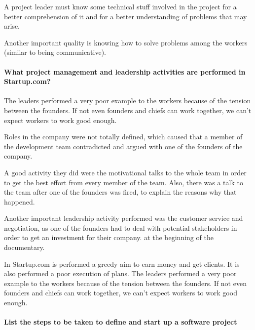 \documentclass{article}
\begin{document}
A project leader must know some technical stuff involved in the project for a better comprehension of it and for a better understanding of problems that may arise.

Another important quality is knowing how to solve problems among the workers (similar to being communicative).



\paragraph{What project management and leadership activities are performed in Startup.com?}
\paragraph{}




The leaders performed a very poor example to the workers because of the tension between the founders. If not even founders and chiefs can work together, we can't expect workers to work good enough.

Roles in the company were not totally defined, which caused that a member of the development team contradicted and argued with one of the founders of the company.

A good activity they did were the motivational talks to the whole team in order to get the best effort from every member of the team. Also, there was a talk to the team after one of the founders was fired, to explain the reasons why that happened. 

Another important leadership activity performed was the customer service and negotiation, as one of the founders had to deal with potential stakeholders in order to get an investment for their company. at the beginning of the documentary.


In Startup.com is performed a greedy aim to earn money and get clients. It is also performed a poor execution of plans. The leaders performed a very poor example to the workers because of the tension between the founders. If not even founders and chiefs can work together, we can't expect workers to work good enough.


\paragraph{List the steps to be taken to define and start up a software project}
\paragraph{}
\end{document}
